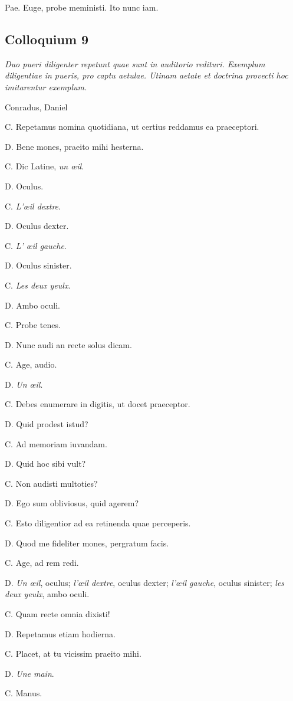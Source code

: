 \documentclass{article}
\newcommand{\fr}[1]{\foreignlanguage{french}{\emph{#1}}}
\begin{document}
Pae. Euge, probe meministi. Ito nunc iam.

\subsection{Colloquium 9}
\emph{Duo pueri diligenter repetunt quae sunt in auditorio redituri. Exemplum diligentiae in pueris, pro captu aetulae. Utinam aetate et doctrina provecti hoc imitarentur exemplum.}

Conradus, Daniel

C. Repetamus nomina quotidiana, ut certius reddamus ea praeceptori.

D. Bene mones, praeito mihi hesterna.

C. Dic Latine, \fr{un œil}.

D. Oculus.

C. \fr{L’œil dextre}.

D. Oculus dexter.

C. \fr{L’ œil gauche}.

D. Oculus sinister.

C. \fr{Les deux yeulx}.

D. Ambo oculi.

C. Probe tenes.

D. Nunc audi an recte solus dicam.

C. Age, audio.

D. \fr{Un œil}.

C. Debes enumerare in digitis, ut docet praeceptor.

D. Quid prodest istud?

C. Ad memoriam iuvandam.

D. Quid hoc sibi vult?

C. Non audisti multoties?

D. Ego sum obliviosus, quid agerem?

C. Esto diligentior ad ea retinenda quae perceperis.

D. Quod me fideliter mones, pergratum facis.

C. Age, ad rem redi.

D. \fr{Un œil}, oculus; \fr{l’œil dextre}, oculus dexter; \fr{l’œil gauche}, oculus sinister; \fr{les deux yeulx}, ambo oculi.

C. Quam recte omnia dixisti!

D. Repetamus etiam hodierna.

C. Placet, at tu vicissim praeito mihi.

D. \fr{Une main}.

C. Manus.
\end{document}
